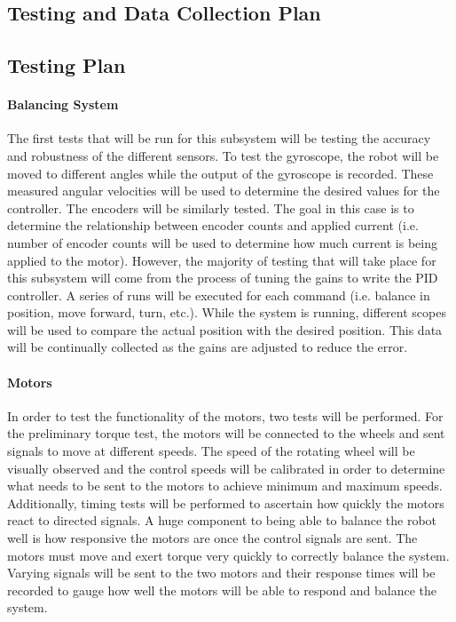 \documentclass[11pt]{report}
\begin{document}
\begin{spacing}{1.5}
\section*{Testing and Data Collection Plan} %

\subsection*{Testing Plan}

\paragraph*{Balancing System}
The first tests that will be run for this subsystem will be testing the accuracy and robustness of the different sensors.  To test the gyroscope, the robot will be moved to different angles while the output of the gyroscope is recorded.  These measured angular velocities will be used to determine the desired values for the controller.  The encoders will be similarly tested.  The goal in this case is to determine the relationship between encoder counts and applied current (i.e. number of encoder counts will be used to determine how much current is being applied to the motor).    However, the majority of testing that will take place for this subsystem will come from the process of tuning the gains to write the PID controller.  A series of runs will be executed for each command (i.e. balance in position, move forward, turn, etc.).  While the system is running, different scopes will be used to compare the actual position with the desired position.  This data will be continually collected as the gains are adjusted to reduce the error.  

\paragraph*{Motors}
In order to test the functionality of the motors, two tests will be performed. For the preliminary torque test, the motors will be connected to the wheels and sent signals to move at different speeds. The speed of the rotating wheel will be visually observed and the control speeds will be calibrated in order to determine what needs to be sent to the motors to achieve minimum and maximum speeds. Additionally, timing tests will be performed to ascertain how quickly the motors react to directed signals. A huge component to being able to balance the robot well is how responsive the motors are once the control signals are sent. The motors must move and exert torque very quickly to correctly balance the system. Varying signals will be sent to the two motors and their response times will be recorded to gauge how well the motors will be able to respond and balance the system. 


\end{spacing}
\end{document}

